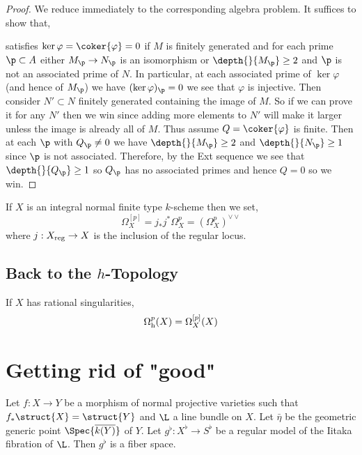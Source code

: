 \documentclass[12pt]{article}
\begin{document}
\begin{proof}
We reduce immediately to the corresponding algebra problem. It suffices to show that,
\begin{center}
\end{center}
satisfies $\ker{\varphi} = \coker{\varphi} = 0$ if $M$ is finitely generated and for each prime $\p \subset A$ either $M_\p \to N_\p$ is an isomorphism or $\depth{}{M_\p} \ge 2$ and $\p$ is not an associated prime of $N$. In particular, at each associated prime of $\ker{\varphi}$ (and hence of $M_\p$) we have $(\ker{\varphi})_\p = 0$ we see that $\varphi$ is injective. Then consider $N' \subset N$ finitely generated containing the image of $M$. So if we can prove it for any $N'$ then we win since adding more elements to $N'$ will make it larger unless the image is already all of $M$. Thus assume $Q = \coker{\varphi}$ is finite. Then at each $\p$ with $Q_\p \neq 0$ we have $\depth{}{M_\p} \ge 2$ and $\depth{}{N_\p} \ge 1$ since $\p$ is not associated. Therefore, by the Ext sequence we see that $\depth{}{Q_\p} \ge 1$ so $Q_\p$ has no associated primes and hence $Q = 0$ so we win.
\end{proof}

\begin{defn}
If $X$ is an integral normal finite type $k$-scheme then we set,
\[ \Omega^{[p]}_X  = j_* j^* \Omega_X^p = (\Omega_X^p)^{\vee \vee} \]
where $j : X_{\mathrm{reg}} \to X$ is the inclusion of the regular locus.
\end{defn}

\subsection{Back to the $h$-Topology}

\begin{theorem}
If $X$ has rational singularities,
\[ \Omega^p_{\mathrm{h}}(X) = \Omega^{[p]}_X(X) \]
\end{theorem}

\section{Getting rid of "good"}

Let $f : X \to Y$ be a morphism of normal projective varieties such that $f_* \struct{X} = \struct{Y}$ and $\L$ a line bundle on $X$. Let $\bar{\eta}$ be the geometric generic point $\Spec{\overline{k(Y)}}$ of $Y$. Let $g^{\flat} : X^\flat \to S^\flat$ be a regular model of the Iitaka fibration of $\L$. Then $g^\flat$ is a fiber space. 
\end{document}
